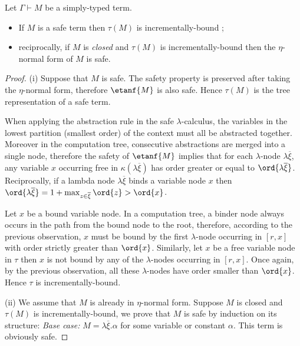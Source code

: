 \begin{lem}
\label{lem:safe_imp_incrbound}
Let $\Gamma \vdash M$ be a simply-typed term.
\begin{itemize}
\item[(i)] If $M$ is a safe term then $\tau(M)$ is incrementally-bound ;
\item[(ii)] reciprocally, if $M$ is \emph{closed} and $\tau(M)$ is incrementally-bound then the $\eta$-normal form of $M$ is safe.
\end{itemize}
\end{lem}
\begin{proof}
(i) Suppose that $M$ is safe. The safety property is preserved after taking the $\eta$-normal form, therefore
$\etanf{M}$ is also safe. Hence $\tau(M)$ is the tree representation of a safe term.

When applying the abstraction rule in the safe $\lambda$-calculus,
the variables in the lowest partition (smallest order) of the
context must all be abstracted together. Moreover in the computation
tree, consecutive abstractions are merged into a single node,
therefore the safety of $\etanf{M}$ implies that for each
$\lambda$-node $\lambda \overline{\xi}$, any variable $x$ occurring
free in $\kappa(\lambda \overline{\xi})$ has order greater or equal
to $\ord{\lambda \overline{\xi}}$. Reciprocally, if a lambda node
$\lambda \overline{\xi}$ binds a variable node $x$ then
$\ord{\lambda \overline{\xi}} = 1+\max_{z\in\overline{\xi}} \ord{z}
> \ord{x}$.

Let $x$ be a bound variable node. In a computation tree, a binder node always occurs in the path from the bound node to the root,
therefore, according to the previous observation, $x$ must be bound by the first $\lambda$-node occurring in $[r,x]$
with order strictly greater than $\ord{x}$.
Similarly, let $x$ be a free variable node in $\tau$ then $x$ is not bound by any of the $\lambda$-nodes occurring in $[r,x]$.
Once again, by the previous observation, all these $\lambda$-nodes have order smaller than $\ord{x}$.
Hence $\tau$ is incrementally-bound.

(ii) We assume that $M$ is already in $\eta$-normal form. Suppose
$M$ is closed and $\tau(M)$ is incrementally-bound, we prove that
$M$ is safe by induction on its structure: \emph{Base case:} $M =
\lambda \overline{\xi} . \alpha$ for some variable or constant
$\alpha$. This term is obviously safe.


\end{proof}
